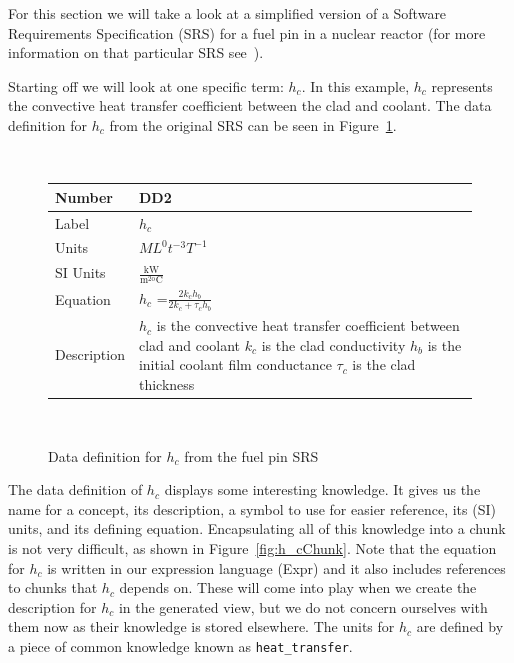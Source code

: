 \documentclass[preprint, 10pt]{sigplanconf}
\newcommand{\colAwidth}{0.1\textwidth}
\newcommand{\colBwidth}{0.34\textwidth}
\begin{document}
For this section we will take a look at a simplified version of a Software
Requirements Specification (SRS) for a fuel pin in a nuclear reactor (for more
information on that particular SRS see~\cite{SmithAndKoothoor2016}).

Starting off we will look at one specific term: $h_c$. In this example, $h_c$
represents the convective heat transfer coefficient between the clad and
coolant. The data definition for $h_c$ from the original SRS can be seen in
Figure~\ref{fig:h_c}.

\begin{figure}
~\newline \noindent \begin{minipage}{\textwidth}
\begin{tabular}{p{\colAwidth} p{\colBwidth}}
\toprule \textbf{Number} & \textbf{DD2 \label{hc}}
\\ \midrule 
Label & 
$h_{c}$
\\ \midrule
Units & $ML^0t^{-3}T^{-1}$\\ \midrule
SI Units & $\mathrm{\frac{kW}{m^{2o}C}}$\\ \midrule
Equation & $h_{c}$ =$
\frac{2k_{c}h_{b}}{2k_{c}+\tau_{c}h_{b}}$\\ \midrule
Description & $h_{c}$ is the convective heat transfer coefficient between clad
and coolant
\newline
$k_{c}$ is the
clad conductivity \newline
$h_{b}$ is the
initial coolant film conductance \newline
$\tau_{c}$ is the
clad thickness 
\newline
\end{tabular} \end{minipage}\\ 
\caption{Data definition for $h_c$ from the fuel pin SRS}
\label{fig:h_c}
\end{figure}

The data definition of $h_c$ displays some interesting knowledge. It gives us
the name for a concept, its description, a symbol to use for easier reference,
its (SI) units, and its defining equation. Encapsulating all of this knowledge
into a chunk is not very difficult, as shown in Figure~\ref{fig:h_cChunk}. Note
that the equation for $h_c$ is written in our expression language (Expr) and it
also includes references to chunks that $h_c$ depends on. These will come into
play when we create the description for $h_c$ in the generated view, but we do
not concern ourselves with them now as their knowledge is stored elsewhere.
The units for $h_c$ are defined by a piece of common knowledge known as
\verb|heat_transfer|.
\end{document}
